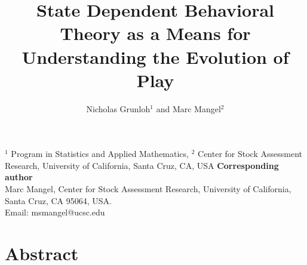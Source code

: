 \documentclass[12pt, letterpaper, fleqn]{article}
\title{State Dependent Behavioral Theory as a Means for Understanding the Evolution of Play}
\author{Nicholas Grunloh$^1$ and Marc Mangel$^2$ }
\begin{document}
\setlength{\mathindent}{3mm}
\maketitle
%
\noindent $^1$ {\color{red}Program} in Statistics and Applied Mathematics,  $^2$ Center for Stock Assessment Research,  University of California, Santa Cruz, CA, USA
%
\vspace{2.7 in}
%
\noindent \textbf{Corresponding author}\\
Marc Mangel, Center for Stock Assessment Research, University of California, Santa Cruz, CA 95064, USA.\\
Email: msmangel@ucsc.edu

%
%
\newpage
\section*{Abstract}
  
\end{document}
